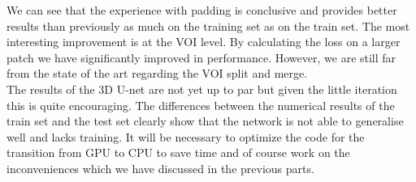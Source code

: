 We can see that the experience with padding is conclusive and provides better results than previously as much on the training set as on the train set. The most interesting improvement is at the VOI level. By calculating the loss on a larger patch we have significantly improved in performance. However, we are still far from the state of the art regarding the VOI split and merge.\\

The results of the 3D U-net are not yet up to par but given the little iteration this is quite encouraging. The differences between the numerical results of the train set and the test set clearly show that the network is not able to generalise well and lacks training. It will be necessary to optimize the code for the transition from GPU to CPU to save time and of course work on the inconveniences which we have discussed in the previous parts.

